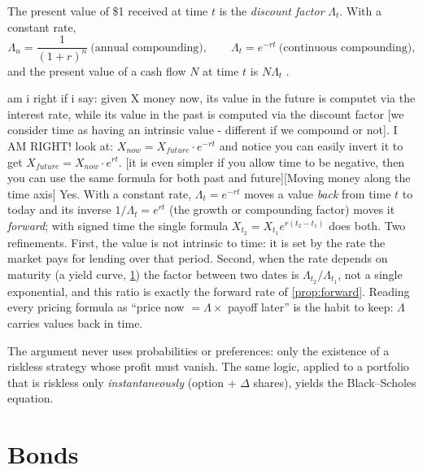 \begin{paracol}{2}
\begin{definition}
The present value of \$1 received at time $t$ is the \emph{discount factor} $\Lambda_t$. With a
constant rate,
\[
  \Lambda_n = \frac{1}{(1+r)^n} \ \text{(annual compounding)},\qquad
  \Lambda_t = e^{-rt} \ \text{(continuous compounding)},
\]
and the present value of a cash flow $N$ at time $t$ is $N\Lambda_t$ .
\end{definition}\begin{answer}{am i right if i say: given X money now, its value in the future is computet via the interest rate, while its value in the past is computed via the discount factor [we consider time as having an intrinsic value - different if we compound or not]. I AM RIGHT! look at: $X_{now} = X_{future} \cdot e^{-rt}$ and notice you can easily invert it to get $X_{future} = X_{now} \cdot e^{rt}$. [it is even simpler if you allow time to be negative, then you can use the same formula for both past and future]}[Moving money along the time axis]
Yes. With a constant rate, $\Lambda_t = e^{-rt}$ moves a value \emph{back} from time $t$ to today and its
inverse $1/\Lambda_t = e^{rt}$ (the growth or compounding factor) moves it \emph{forward}; with signed time
the single formula $X_{t_2} = X_{t_1}e^{r(t_2-t_1)}$ does both. Two refinements. First, the value is not
intrinsic to time: it is set by the rate the market pays for lending over that period. Second, when the
rate depends on maturity (a yield curve, \cref{sec:bonds}) the factor between two dates is
$\Lambda_{t_2}/\Lambda_{t_1}$, not a single exponential, and this ratio is exactly the forward rate of
\cref{prop:forward}. Reading every pricing formula as ``price now $=\Lambda\times$ payoff later'' is the
habit to keep: $\Lambda$ carries values back in time.
\end{answer}

\begin{intuition}
The argument never uses probabilities or preferences: only the existence of a riskless strategy
whose profit must vanish. The same logic, applied to a portfolio that is riskless only
\emph{instantaneously} (option + $\Delta$ shares), yields the Black--Scholes equation.
\end{intuition}

\section{Bonds}\label{sec:bonds}


\end{paracol}
